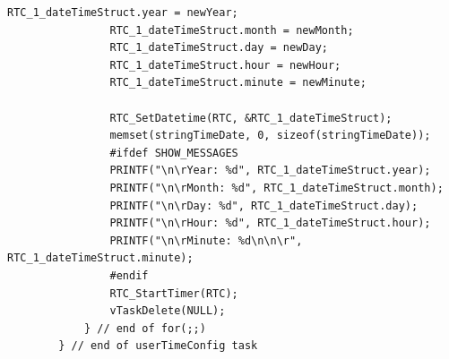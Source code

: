\documentclass[12pt,a4paper]{article}
\begin{document}
\begin{lstlisting}[label={lst:userTimeConfig}, caption=userTimeConfig() task]
                RTC_1_dateTimeStruct.year = newYear;
                RTC_1_dateTimeStruct.month = newMonth;
                RTC_1_dateTimeStruct.day = newDay;
                RTC_1_dateTimeStruct.hour = newHour;
                RTC_1_dateTimeStruct.minute = newMinute;

                RTC_SetDatetime(RTC, &RTC_1_dateTimeStruct);
                memset(stringTimeDate, 0, sizeof(stringTimeDate));
                #ifdef SHOW_MESSAGES
                PRINTF("\n\rYear: %d", RTC_1_dateTimeStruct.year);
                PRINTF("\n\rMonth: %d", RTC_1_dateTimeStruct.month);
                PRINTF("\n\rDay: %d", RTC_1_dateTimeStruct.day);
                PRINTF("\n\rHour: %d", RTC_1_dateTimeStruct.hour);
                PRINTF("\n\rMinute: %d\n\n\r", RTC_1_dateTimeStruct.minute);
                #endif
                RTC_StartTimer(RTC);
                vTaskDelete(NULL);
            } // end of for(;;)
        } // end of userTimeConfig task
        \end{lstlisting}
        
\end{document}
